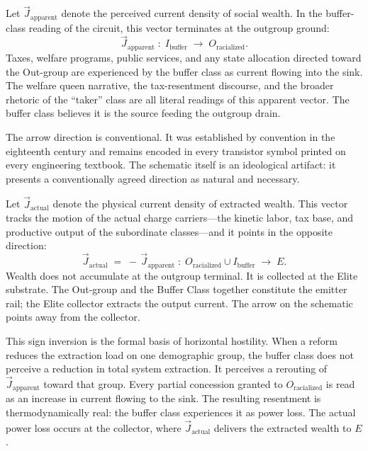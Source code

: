 \begin{definition}
Let $\vec{J}_{\text{apparent}}$ denote the perceived current density of social wealth. In the buffer-class reading of the circuit, this vector terminates at the outgroup ground:
\begin{equation}\label{eq:13.18-conventional-current}
\vec{J}_{\text{apparent}} \;:\; I_{\text{buffer}} \;\longrightarrow\; O_{\text{racialized}} .
\end{equation}
Taxes, welfare programs, public services, and any state allocation directed toward the Out-group are experienced by the buffer class as current flowing into the sink. The welfare queen narrative, the tax-resentment discourse, and the broader rhetoric of the ``taker'' class are all literal readings of this apparent vector. The buffer class believes it is the source feeding the outgroup drain.
\end{definition}

The arrow direction is conventional. It was established by convention in the eighteenth century and remains encoded in every transistor symbol printed on every engineering textbook. The schematic itself is an ideological artifact: it presents a conventionally agreed direction as natural and necessary.

\begin{definition}
Let $\vec{J}_{\text{actual}}$ denote the physical current density of extracted wealth. This vector tracks the motion of the actual charge carriers---the kinetic labor, tax base, and productive output of the subordinate classes---and it points in the opposite direction:
\begin{equation}\label{eq:13.19-electron-flow}
\vec{J}_{\text{actual}} \;=\; -\,\vec{J}_{\text{apparent}} \;:\; O_{\text{racialized}} \cup I_{\text{buffer}} \;\longrightarrow\; E .
\end{equation}
Wealth does not accumulate at the outgroup terminal. It is collected at the Elite substrate. The Out-group and the Buffer Class together constitute the emitter rail; the Elite collector extracts the output current. The arrow on the schematic points away from the collector.
\end{definition}

This sign inversion is the formal basis of horizontal hostility. When a reform reduces the extraction load on one demographic group, the buffer class does not perceive a reduction in total system extraction. It perceives a rerouting of $\vec{J}_{\text{apparent}}$ toward that group. Every partial concession granted to $O_{\text{racialized}}$ is read as an increase in current flowing to the sink. The resulting resentment is thermodynamically real: the buffer class experiences it as power loss. The actual power loss occurs at the collector, where $\vec{J}_{\text{actual}}$ delivers the extracted wealth to $E$.

